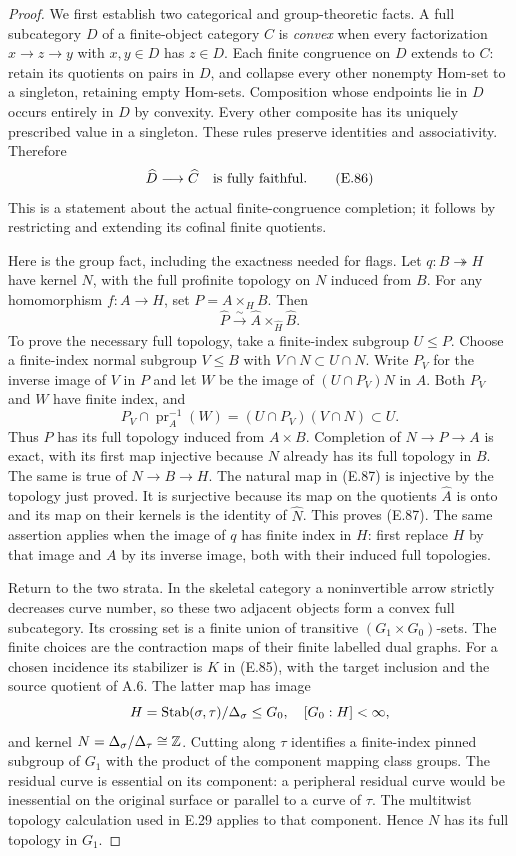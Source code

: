 \begin{proof}
We first establish two categorical and group-theoretic facts.
A full subcategory $D$ of a finite-object category $C$ is
\emph{convex} when every factorization $x\to z\to y$ with
$x,y\in D$ has $z\in D$.  Each finite congruence on $D$
extends to $C$: retain its quotients on pairs in $D$, and
collapse every other nonempty Hom-set to a singleton, retaining
empty Hom-sets.  Composition whose endpoints lie in $D$ occurs
entirely in $D$ by convexity.  Every other composite has its
uniquely prescribed value in a singleton.  These rules preserve
identities and associativity.  Therefore
\[
                 \widehat D\longrightarrow\widehat C
       \quad\hbox{is fully faithful}.                         \tag{E.86}
\]
This is a statement about the actual finite-congruence
completion; it follows by restricting and extending its
cofinal finite quotients.

Here is the group fact, including the exactness needed for
flags.  Let $q:B\twoheadrightarrow H$ have kernel $N$, with
the full profinite topology on $N$ induced from $B$.  For any
homomorphism $f:A\to H$, set $P=A\times_H B$.  Then
\[
 \widehat P\xrightarrow{\sim}
       \widehat A\times_{\widehat H}\widehat B.                \tag{E.87}
\]
To prove the necessary full topology, take a finite-index
subgroup $U\leq P$.  Choose a finite-index normal subgroup
$V\leq B$ with $V\cap N\subset U\cap N$.
Write $P_V$ for the inverse image of $V$ in $P$ and let
$W$ be the image of $(U\cap P_V)N$ in $A$.
Both $P_V$ and $W$ have finite index, and
\[
  P_V\cap\operatorname{pr}_A^{-1}(W)
     =(U\cap P_V)(V\cap N)\subset U.
\]
Thus $P$ has its full topology induced from $A\times B$.
Completion of $N\to P\to A$ is exact, with its first map
injective because $N$ already has its full topology in $B$.
The same is true of $N\to B\to H$.
The natural map in (E.87) is injective by the topology just
proved.  It is surjective because its map on the quotients
$\widehat A$ is onto and its map on their kernels is the
identity of $\widehat N$.  This proves (E.87).
The same assertion applies when the image of $q$ has finite
index in $H$: first replace $H$ by that image and $A$ by
its inverse image, both with their induced full topologies.

Return to the two strata.  In the skeletal category a
noninvertible arrow strictly decreases curve number, so
these two adjacent objects form a convex full subcategory.
Its crossing set is a finite union of transitive
$(G_1\times G_0)$-sets.  The finite choices are the
contraction maps of their finite labelled dual graphs.
For a chosen incidence its stabilizer is $K$ in (E.85),
with the target inclusion and the source quotient of A.6.
The latter map has image
\[
 H=\operatorname{Stab}(\sigma,\tau)/\Delta_\sigma\leq G_0,
 \quad [G_0:H]<\infty,
\]
and kernel $N=\Delta_\sigma/\Delta_\tau\cong\mathbb Z$.
Cutting along $\tau$ identifies a finite-index pinned
subgroup of $G_1$ with the product of the component mapping
class groups.  The residual curve is essential on its
component: a peripheral residual curve would be inessential
on the original surface or parallel to a curve of $\tau$.
The multitwist topology calculation used in E.29 applies to
that component.  Hence $N$ has its full topology in $G_1$.


\end{proof}
